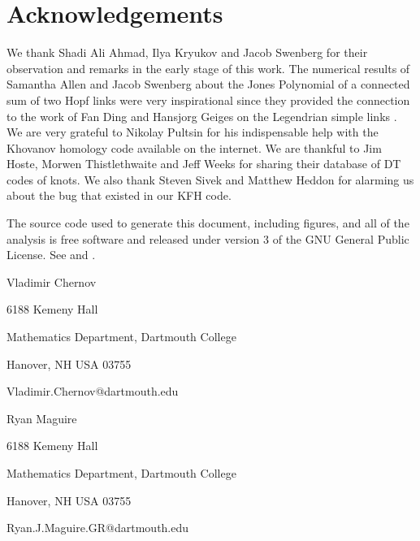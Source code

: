 \documentclass{article}
\theoremstyle{plain}
\begin{document}
    \section{Acknowledgements}
        We thank Shadi Ali Ahmad, Ilya Kryukov and Jacob Swenberg for their
        observation and remarks in the early stage of this work. The numerical
        results of Samantha Allen and Jacob Swenberg about the Jones Polynomial
        of a connected sum of two Hopf links were very inspirational since they
        provided the connection to the work of Fan Ding and Hansjorg Geiges on
        the Legendrian simple links . We are very grateful to Nikolay Pultsin
        for his indispensable help with the Khovanov homology code available
        on the internet. We are thankful to Jim Hoste, Morwen Thistlethwaite
        and Jeff Weeks for sharing their database of DT codes of knots.
        We also thank Steven Sivek and Matthew Heddon
        for alarming us about the bug that
        existed in our KFH code.
    \newpage
    
    
    \newpage
    The source code used to generate this document, including figures, and all
    of the analysis is free software and released under version 3 of the
    GNU General Public License. See
    \cite{mathematicsandphysics} and \cite{libtmpl}.
    \par\hfill\par
    Vladimir Chernov
    \par
    6188 Kemeny Hall
    \par
    Mathematics Department, Dartmouth College
    \par
    Hanover, NH USA 03755
    \par
    Vladimir.Chernov@dartmouth.edu
    \par\hfill\par
    Ryan Maguire
    \par
    6188 Kemeny Hall
    \par
    Mathematics Department, Dartmouth College
    \par
    Hanover, NH USA 03755
    \par
    Ryan.J.Maguire.GR@dartmouth.edu
\end{document}
